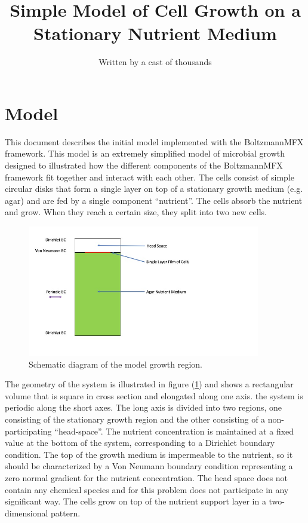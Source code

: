 \documentclass[12pt]{article}
\begin{document}
\title{Simple Model of Cell Growth on a Stationary Nutrient Medium}
\author{Written by a cast of thousands}
\maketitle

\renewcommand{\thetable}{\Roman{table}}

\section{Model}
This document describes the initial model implemented with the BoltzmannMFX
framework. This model is an extremely simplified model of microbial growth
designed to illustrated how the different components of the BoltzmannMFX
framework fit together and interact with each other. The cells consist of simple
circular disks that form a single layer on top of a stationary growth medium
(e.g. agar) and are fed by a single component ``nutrient''. The cells absorb the
nutrient and grow. When they reach a certain size, they split into two new
cells.

\begin{figure}
\centering
\includegraphics[width=4.0in,keepaspectratio=true]{FullSys}
\caption{\label{fullsys} Schematic diagram of the model growth region.}
\end{figure}
The geometry of the system is illustrated in figure (\ref{fullsys}) and shows a
rectangular volume that is square in cross section and elongated along one axis.
the system is periodic along the short axes. The long axis is divided into two
regions, one consisting of the stationary growth region and the other consisting
of a non-participating ``head-space''. The nutrient concentration is maintained
at a fixed value at the bottom of the system, corresponding to a Dirichlet
boundary condition. The top of the growth medium is impermeable to the nutrient,
so it should be characterized by a Von Neumann boundary condition representing
a zero normal gradient for the nutrient concentration. The head space does not
contain any chemical species and for this problem does not participate in any
significant way. The cells grow on top of the nutrient support layer in a
two-dimensional pattern.
\end{document}
